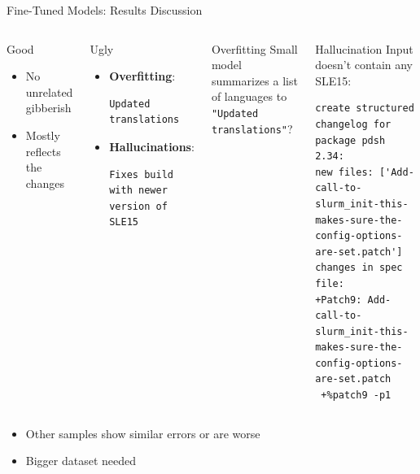 \documentclass[aspectratio=169]{beamer}
\begin{document}
\begin{frame}[fragile]{Fine-Tuned Models: Results Discussion}
\begin{columns}[t]
\begin{block}{Good}
  \begin{itemize}
    \item No unrelated gibberish
    \item Mostly reflects the changes
  \end{itemize}
\end{block}
\begin{alertblock}{Ugly}
  \begin{itemize}
    \item \textbf{Overfitting}:
    \begin{lstlisting}[basicstyle=\ttfamily\tiny]
Updated translations
\end{lstlisting}
    \item \textbf{Hallucinations}:
    \begin{lstlisting}[basicstyle=\ttfamily\tiny]
Fixes build with newer version of SLE15
\end{lstlisting}
  \end{itemize}
\end{alertblock}
\begin{block}{Overfitting}
    Small model summarizes a list of languages to \texttt{"Updated translations"}?
\end{block}
\begin{block}{Hallucination}
Input doesn't contain any SLE15:
    \begin{lstlisting}[basicstyle=\ttfamily\tiny]
create structured changelog for package pdsh 2.34:
new files: ['Add-call-to-slurm_init-this-makes-sure-the-config-options-are-set.patch']
changes in spec file:
+Patch9: Add-call-to-slurm_init-this-makes-sure-the-config-options-are-set.patch
 +%patch9 -p1
\end{lstlisting}
\end{block}
\end{columns}
\begin{itemize}
  \item Other samples show similar errors or are worse
  \item Bigger dataset needed
\end{itemize}
\end{frame}
\end{document}
